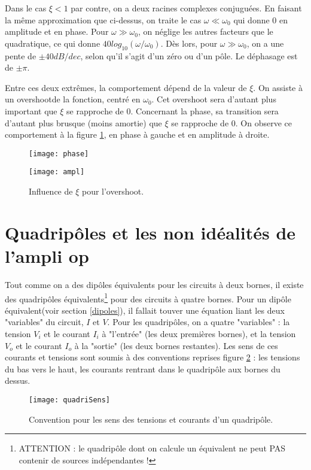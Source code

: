 Dans le cas $\xi<1$ par contre, on a deux racines complexes conjuguées. En faisant la même approximation que ci-dessus, on traite le cas $\omega \ll \omega_0$ qui donne 0 en amplitude et en phase. Pour $\omega \gg \omega_0$, on néglige les autres facteurs que le quadratique, ce qui donne $40log_{10}(\omega/\omega_0)$. Dès lors, pour $\omega \gg \omega_0$, on a une pente de $\pm40dB/dec$, selon qu'il s'agit d'un zéro ou d'un pôle. Le déphasage est de $\pm\pi$.

Entre ces deux extrêmes, la comportement dépend de la valeur de $\xi$. On assiste à un \og overshoot\fg de la fonction, centré en $\omega_0$. Cet overshoot sera d'autant plus important que $\xi$ se rapproche de 0. Concernant la phase, sa transition sera d'autant plus brusque (moins amortie) que $\xi$ se rapproche de 0. On observe ce comportement à la figure \ref{complexes}, en phase à gauche et en amplitude à droite.
\begin{figure}[H]
\centering
\begin{minipage}{.45\linewidth}
\texttt{[image: phase]}
\end{minipage}
\hfill
\begin{minipage}{.45\linewidth}
\texttt{[image: ampl]}
\end{minipage}
\caption{Influence de $\xi$ pour l'overshoot.}
\label{complexes}
\end{figure}

\section{Quadripôles et les non idéalités de l'ampli op}
Tout comme on a des dipôles équivalents pour les circuits à deux bornes, il existe des quadripôles équivalents\footnote{ATTENTION : le quadripôle dont on calcule un équivalent ne peut PAS contenir de sources indépendantes !} pour des circuits à quatre bornes. Pour un dipôle équivalent(voir section \ref{dipoles}), il fallait touver une équation liant les deux "variables" du circuit, $I$ et $V$. Pour les quadripôles, on a quatre "variables" : la tension $V_i$ et le courant $I_i$ à "l'entrée" (les deux premières bornes), et la tension $V_o$ et le courant $I_o$ à la "sortie" (les deux bornes restantes). Les sens de ces courants et tensions sont soumis à des conventions reprises figure \ref{quadriSens} : les tensions du bas vers le haut, les courants rentrant dans le quadripôle aux bornes du dessus.
\begin{figure}[h]
	\centering
    \texttt{[image: quadriSens]}
    \caption{Convention pour les sens des tensions et courants d'un quadripôle.}
    \label{quadriSens}
\end{figure}
